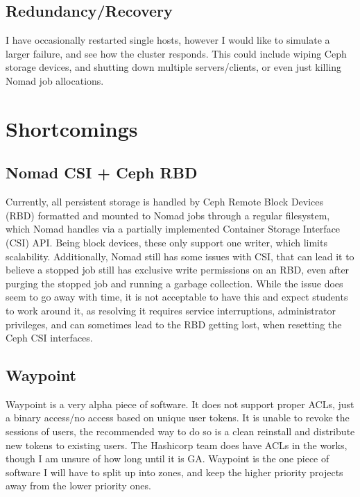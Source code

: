 \documentclass{article}
\begin{document}
\subsection{Redundancy/Recovery}
I have occasionally restarted single hosts, however I would like to simulate a larger failure, and see how the cluster responds. This could include wiping Ceph storage devices, and shutting down multiple servers/clients, or even just killing Nomad job allocations.


\section{Shortcomings}
\subsection{Nomad CSI + Ceph RBD}
Currently, all persistent storage is handled by Ceph Remote Block Devices (RBD) formatted and mounted to Nomad jobs through a regular filesystem, which Nomad handles via a partially implemented Container Storage Interface (CSI) API. Being block devices, these only support one writer, which limits scalability. Additionally, Nomad still has some issues with CSI, that can lead it to believe a stopped job still has exclusive write permissions on an RBD, even after purging the stopped job and running a garbage collection. While the issue does seem to go away with time, it is not acceptable to have this and expect students to work around it, as resolving it requires service interruptions, administrator privileges, and can sometimes lead to the RBD getting lost, when resetting the Ceph CSI interfaces.

\subsection{Waypoint}
Waypoint is a very alpha piece of software. It does not support proper ACLs, just a binary access/no access based on unique user tokens. It is unable to revoke the sessions of users, the recommended way to do so is a clean reinstall and distribute new tokens to existing users. The Hashicorp team does have ACLs in the works, though I am unsure of how long until it is GA. Waypoint is the one piece of software I will have to split up into zones, and keep the higher priority projects away from the lower priority ones. 
\end{document}
